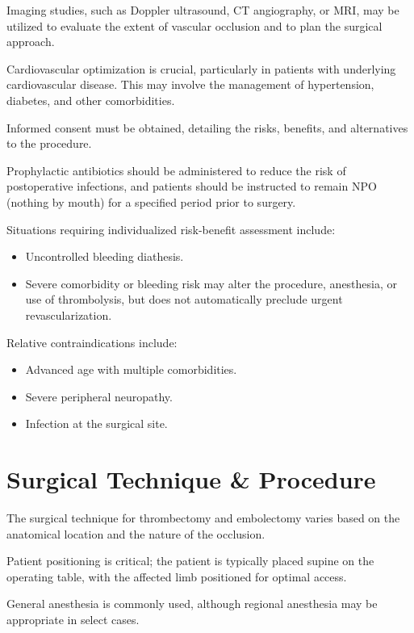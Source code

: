 Imaging studies, such as Doppler ultrasound, CT angiography, or MRI, may be utilized to evaluate the extent of vascular occlusion and to plan the surgical approach.

Cardiovascular optimization is crucial, particularly in patients with underlying cardiovascular disease. This may involve the management of hypertension, diabetes, and other comorbidities.

Informed consent must be obtained, detailing the risks, benefits, and alternatives to the procedure.

Prophylactic antibiotics should be administered to reduce the risk of postoperative infections, and patients should be instructed to remain NPO (nothing by mouth) for a specified period prior to surgery.

Situations requiring individualized risk-benefit assessment include:

\begin{itemize}
    \item Uncontrolled bleeding diathesis.
    \item Severe comorbidity or bleeding risk may alter the procedure, anesthesia, or use of thrombolysis, but does not automatically preclude urgent revascularization.
\end{itemize}

Relative contraindications include:

\begin{itemize}
    \item Advanced age with multiple comorbidities.
    \item Severe peripheral neuropathy.
    \item Infection at the surgical site.
\end{itemize}

\section*{Surgical Technique \& Procedure}

The surgical technique for thrombectomy and embolectomy varies based on the anatomical location and the nature of the occlusion. 

Patient positioning is critical; the patient is typically placed supine on the operating table, with the affected limb positioned for optimal access.

General anesthesia is commonly used, although regional anesthesia may be appropriate in select cases.

